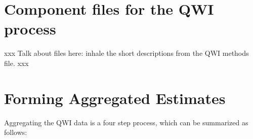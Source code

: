 \section{Component files for the QWI process}
\label{sec:files}
%
%
%
%

%
%

%
%

%
xxx Talk about files here: inhale the short descriptions from the QWI
methods file. xxx

\section{Forming Aggregated Estimates}
\label{sec:aggregate}

Aggregating the QWI data is a four step process, which can be summarized as
follows:


